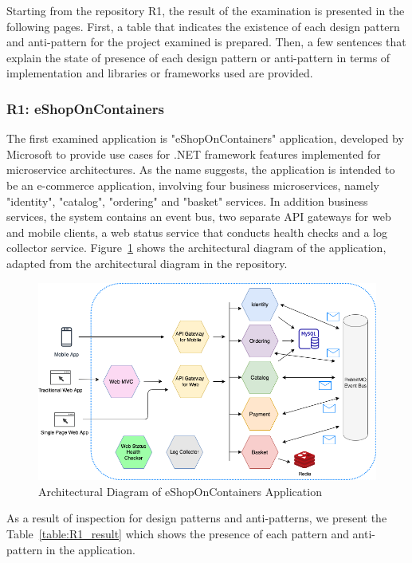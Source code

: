 \documentclass{Configuration_Files/PoliMi3i_thesis}
\begin{document}
Starting from the repository R1, the result of the examination is presented in the following pages.
First, a table that indicates the existence of each design pattern and anti-pattern for the project examined is prepared.
Then, a few sentences that explain the state of presence of each design pattern or anti-pattern in terms of implementation and libraries or frameworks used are provided. 

\subsubsection{R1: eShopOnContainers}
\label{subsubsec:R1}

The first examined application is "eShopOnContainers" application, developed by Microsoft to provide use cases for .NET framework features implemented for microservice architectures.
As the name suggests, the application is intended to be an e-commerce application, involving four business microservices, namely "identity", "catalog", "ordering" and "basket" services.
In addition business services, the system contains an event bus, two separate API gateways for web and mobile clients, a web status service that conducts health checks and a log collector service.
Figure~\ref{fig:R1_arch} shows the architectural diagram of the application, adapted from the architectural diagram in the repository.

\begin{figure}[H]
\centering
\includegraphics[width=1\textwidth]{myImages/R1.png}
\caption{Architectural Diagram of eShopOnContainers Application}
\label{fig:R1_arch}
\end{figure}

As a result of inspection for design patterns and anti-patterns, we present the Table~\ref{table:R1_result} which shows the presence of each pattern and anti-pattern in the application.
\end{document}
